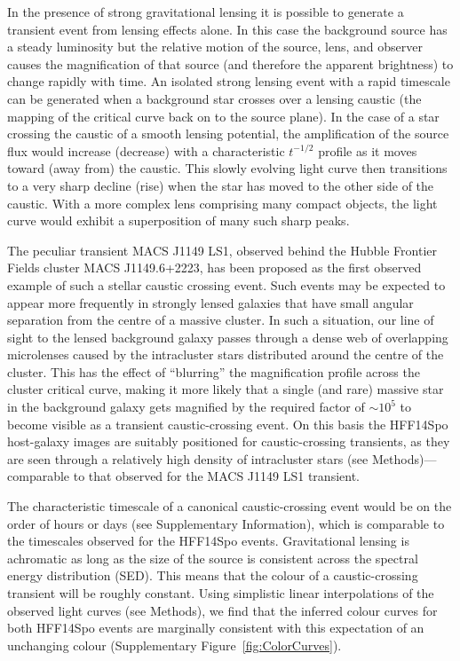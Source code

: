\documentclass{article}
\def\spock{HFF14Spo\xspace}
\begin{document}
In the presence of strong gravitational lensing it is possible to
generate a transient event from lensing effects alone.  In this case
the background source has a steady luminosity but the relative motion
of the source, lens, and observer causes the magnification of that
source (and therefore the apparent brightness) to change rapidly with
time.  An isolated strong lensing event with a rapid timescale can be
generated when a background star crosses over a lensing caustic (the
mapping of the critical curve back on to the source plane).  In the
case of a star crossing the caustic of a smooth lensing potential, the
amplification of the source flux would increase (decrease) with a
characteristic $t^{-1/2}$ profile as it moves toward (away from) the
caustic. This slowly evolving light curve then transitions to a very
sharp decline (rise) when the star has moved to the other side of the
caustic\cite{Schneider:1986, MiraldaEscude:1991}.  With a more complex
lens comprising many compact objects, the light curve would exhibit a
superposition of many such sharp peaks\cite{Lewis:1993, Diego:2017}.

The peculiar transient MACS J1149 LS1, observed behind the Hubble
Frontier Fields cluster MACS J1149.6+2223, has been proposed as the
first observed example of such a stellar caustic crossing
event\cite{Kelly:2017}. Such events may be expected to appear more
frequently in strongly lensed galaxies that have small angular
separation from the centre of a massive cluster. In such a situation,
our line of sight to the lensed background galaxy passes through a
dense web of overlapping microlenses caused by the intracluster stars
distributed around the centre of the cluster. This has the effect of
``blurring'' the magnification profile across the cluster critical
curve, making it more likely that a single (and rare) massive star in
the background galaxy gets magnified by the required factor of
$\sim10^5$ to become visible as a transient caustic-crossing event.
On this basis the \spock host-galaxy images are suitably positioned
for caustic-crossing transients, as they are seen through a relatively
high density of intracluster stars (see Methods)---comparable to that
observed for the MACS J1149 LS1 transient.


The characteristic timescale of a canonical caustic-crossing event
would be on the order of hours or days (see Supplementary
Information), which is comparable to the timescales observed for the
\spock events. Gravitational lensing is achromatic as long as the size
of the source is consistent across the spectral energy distribution
(SED).  This means that the colour of a caustic-crossing transient will
be roughly constant.  Using simplistic linear interpolations of the
observed light curves (see Methods), we find that the inferred colour
curves for both \spock events are marginally consistent with this
expectation of an unchanging colour (Supplementary
Figure~\ref{fig:ColorCurves}).
\end{document}
